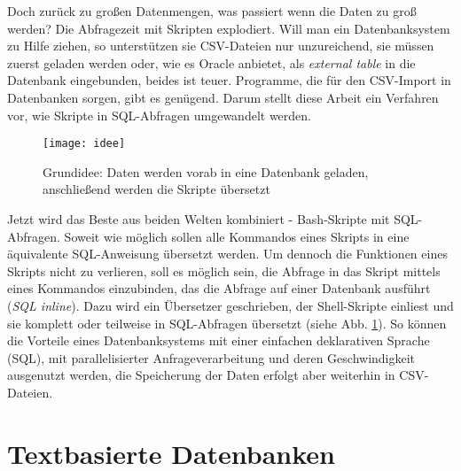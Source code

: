 Doch zurück zu großen Datenmengen, was passiert wenn die Daten zu groß werden? Die Abfragezeit mit Skripten explodiert. Will man ein Datenbanksystem zu Hilfe ziehen, so unterstützen sie CSV-Dateien nur unzureichend, sie müssen zuerst geladen werden oder, wie es Oracle anbietet, als \textit{external table} in die Datenbank eingebunden, beides ist teuer.
Programme, die für den CSV-Import in Datenbanken sorgen, gibt es genügend.
Darum stellt diese Arbeit ein Verfahren vor, wie Skripte in SQL-Abfragen umgewandelt werden.
\begin{figure}
\centering
\texttt{[image: idee]}
\caption{Grundidee: Daten werden vorab in eine Datenbank geladen, anschließend werden die Skripte übersetzt}
\label{fig:idee}
\end{figure}
Jetzt wird das Beste aus beiden Welten kombiniert - Bash-Skripte mit SQL-Abfragen. Soweit wie möglich sollen alle Kommandos eines Skripts in eine äquivalente SQL-Anweisung übersetzt werden. Um dennoch die Funktionen eines Skripts nicht zu verlieren, soll es möglich sein, die Abfrage in das Skript mittels eines Kommandos einzubinden, das die Abfrage auf einer Datenbank ausführt (\textit{SQL inline}).
Dazu wird ein Übersetzer geschrieben, der Shell-Skripte einliest und sie komplett oder teilweise in SQL-Abfragen übersetzt (siehe Abb. \ref{fig:idee}). So können die Vorteile eines Datenbanksystems mit einer einfachen deklarativen Sprache (SQL), mit parallelisierter Anfrageverarbeitung und deren Geschwindigkeit ausgenutzt werden, die Speicherung der Daten erfolgt aber weiterhin in CSV-Dateien.\\

\section{Textbasierte Datenbanken}

